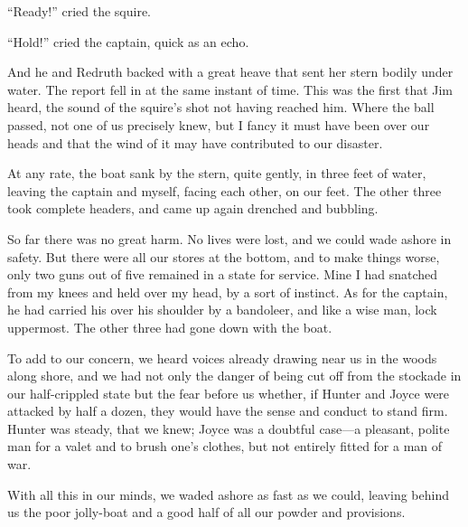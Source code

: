 \enquote{Ready!} cried the squire.

\enquote{Hold!} cried the captain, quick as an echo.

And he and Redruth backed with a great heave that sent her stern bodily under water. The report fell in at the same instant of time. This was the first that Jim heard, the sound of the squire’s shot not having reached him. Where the ball passed, not one of us precisely knew, but I fancy it must have been over our heads and that the wind of it may have contributed to our disaster.

At any rate, the boat sank by the stern, quite gently, in three feet of water, leaving the captain and myself, facing each other, on our feet. The other three took complete headers, and came up again drenched and bubbling.

So far there was no great harm. No lives were lost, and we could wade ashore in safety. But there were all our stores at the bottom, and to make things worse, only two guns out of five remained in a state for service. Mine I had snatched from my knees and held over my head, by a sort of instinct. As for the captain, he had carried his over his shoulder by a bandoleer, and like a wise man, lock uppermost. The other three had gone down with the boat.

To add to our concern, we heard voices already drawing near us in the woods along shore, and we had not only the danger of being cut off from the stockade in our half-crippled state but the fear before us whether, if Hunter and Joyce were attacked by half a dozen, they would have the sense and conduct to stand firm. Hunter was steady, that we knew; Joyce was a doubtful case---a pleasant, polite man for a valet and to brush one’s clothes, but not entirely fitted for a man of war.

With all this in our minds, we waded ashore as fast as we could, leaving behind us the poor jolly-boat and a good half of all our powder and provisions.